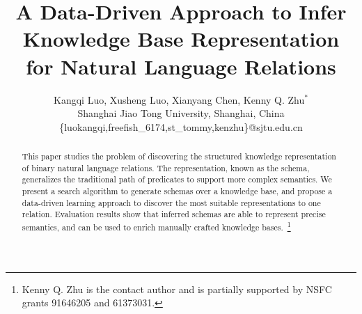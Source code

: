 \documentclass{article}
\begin{document}
%

\title{A Data-Driven Approach to Infer Knowledge Base Representation \\
	for Natural Language Relations}

\author{
Kangqi Luo,\hspace*{3mm} Xusheng Luo,\hspace*{3mm} Xianyang Chen,\hspace*{3mm} Kenny Q. Zhu$^*$\\
Shanghai Jiao Tong University, Shanghai, China\\
\{luokangqi,freefish\_6174,st\_tommy,kenzhu\}@sjtu.edu.cn
}

\maketitle
\begin{abstract}
This paper studies the problem of discovering the structured knowledge representation of binary natural language relations.
The representation, known as the schema, generalizes the traditional path of predicates to support more complex semantics.
We present a search algorithm to generate schemas over a knowledge base, and propose a data-driven learning approach to discover the most suitable representations to one relation.
Evaluation results show that inferred schemas are able to represent precise semantics, and can be used to enrich manually crafted knowledge bases.~\footnote{Kenny Q. Zhu is the contact author and is partially
supported by NSFC grants 91646205 and 61373031.}


\end{abstract}











%








\end{document}
